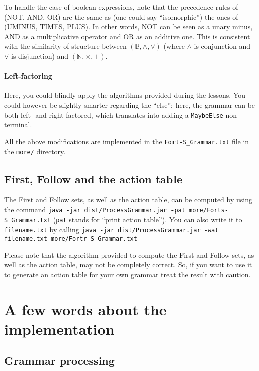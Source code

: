 \documentclass[a4paper]{scrartcl}
\begin{document}
To handle the case of boolean expressions, note that the precedence rules of (NOT, AND, OR) are the same as (one could say ``isomorphic'') the ones of (UMINUS, TIMES, PLUS). In other words, NOT can be seen as a unary minus, AND as a multiplicative operator and OR as an additive one. This is consistent with the similarity of structure between $(\mathbb{B}, \wedge, \vee)$ (where $\wedge$ is conjunction and $\vee$ is disjunction) and $(\mathbb{N}, \times, +)$.

\paragraph{Left-factoring}
Here, you could blindly apply the algorithms provided during the lessons. You could however be slightly smarter regarding the ``else'': here, the grammar can be both left- and right-factored, which translates into adding a \texttt{MaybeElse} non-terminal.

\medskip

All the above modifications are implemented in the \verb#Fort-S_Grammar.txt# file in the \verb#more/# directory.

\subsection{First, Follow and the action table}

The First and Follow sets, as well as the action table, can be computed by using the command \verb#java -jar dist/ProcessGrammar.jar -pat more/Forts-S_Grammar.txt# (\texttt{pat} stands for ``print action table''). You can also write it to \texttt{filename.txt} by calling \verb#java -jar dist/ProcessGrammar.jar -wat filename.txt more/Fortr-S_Grammar.txt#

Please note that the algorithm provided to compute the First and Follow sets, as well as the action table, may not be completely correct. So, if you want to use it to generate an action table for your own grammar treat the result with caution. 

\section{A few words about the implementation}

\subsection{Grammar processing}
\end{document}
